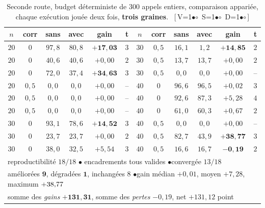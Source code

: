 \documentclass[11pt,a4paper]{article}
\theoremstyle{plain}
\theoremstyle{remark}
\newcommand{\cfgm}[1]{\ifnum#1=1$\bullet$\else$\circ$\fi}
\newcommand{\conf}[3]{%
  \textsf{\footnotesize[\,V\cfgm{#1}\ S\cfgm{#2}\ D\cfgm{#3}\,]}}
\begin{document}
\begin{table}[H]
\centering
\caption{Seconde route, budget déterministe de $300$ appels entiers,
comparaison appariée, chaque exécution jouée deux fois, \textbf{trois
graines}.\ \conf{1}{1}{1}}
\label{tab:geom}
\setlength{\tabcolsep}{3pt}\small
\begin{tabular}{cccccc|cccccc}
\toprule
$n$ & corr & sans & avec & gain & t & $n$ & corr & sans & avec & gain & t\\
\midrule
$20$ & $0$   & $97{,}8$ & $80{,}8$ & $\mathbf{+17{,}03}$ & $3$
 & $30$ & $0{,}5$ & $16{,}1$ & $1{,}2$ & $\mathbf{+14{,}85}$ & $2$\\
$20$ & $0$   & $40{,}6$ & $40{,}6$ & $+0{,}00$ & $2$
 & $30$ & $0{,}5$ & $13{,}7$ & $13{,}7$ & $+0{,}00$ & $2$\\
$20$ & $0$   & $72{,}0$ & $37{,}4$ & $\mathbf{+34{,}63}$ & $3$
 & $30$ & $0{,}5$ & $0{,}0$ & $0{,}0$ & $+0{,}00$ & --\\
$20$ & $0{,}5$ & $0{,}0$ & $0{,}0$ & $+0{,}00$ & --
 & $40$ & $0$ & $96{,}6$ & $96{,}5$ & $+0{,}02$ & $3$\\
$20$ & $0{,}5$ & $0{,}0$ & $0{,}0$ & $+0{,}00$ & --
 & $40$ & $0$ & $92{,}6$ & $87{,}3$ & $+5{,}28$ & $4$\\
$20$ & $0{,}5$ & $0{,}0$ & $0{,}0$ & $+0{,}00$ & --
 & $40$ & $0$ & $61{,}0$ & $60{,}3$ & $+0{,}67$ & $2$\\
$30$ & $0$ & $93{,}1$ & $78{,}6$ & $\mathbf{+14{,}52}$ & $3$
 & $40$ & $0{,}5$ & $0{,}0$ & $0{,}0$ & $+0{,}00$ & --\\
$30$ & $0$ & $23{,}7$ & $23{,}7$ & $+0{,}00$ & $2$
 & $40$ & $0{,}5$ & $82{,}7$ & $43{,}9$ & $\mathbf{+38{,}77}$ & $3$\\
$30$ & $0$ & $38{,}0$ & $32{,}5$ & $+5{,}54$ & $3$
 & $40$ & $0{,}5$ & $16{,}6$ & $16{,}7$ & $\mathbf{-0{,}19}$ & $2$\\
\midrule
\multicolumn{12}{l}{reproductibilité $18/18$ \quad$\bullet$\quad
 encadrements tous valides \quad$\bullet$\quad convergée $13/18$}\\
\multicolumn{12}{l}{améliorées $\mathbf{9}$, dégradées $\mathbf{1}$,
 inchangées $8$ \quad$\bullet$\quad gain médian $+0{,}01$, moyen $+7{,}28$,
 maximum $+38{,}77{}$}\\
\multicolumn{12}{l}{somme des \emph{gains} $\mathbf{+131{,}31}$, somme des
 \emph{pertes} $-0{,}19$, net $+131{,}12$ point}\\
\bottomrule
\end{tabular}
\end{table}
\end{document}
